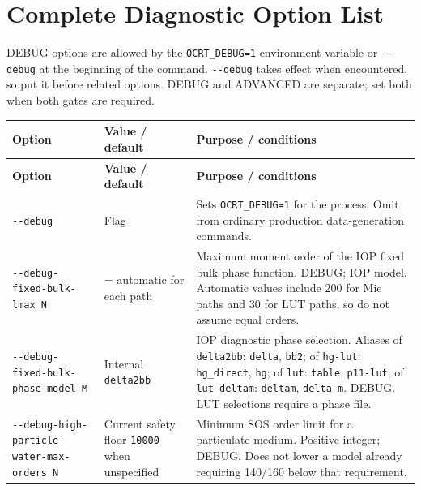 \section{Complete Diagnostic Option List}
\label{sec:auto:03_options:9}
DEBUG options are allowed by the \texttt{OCRT\_\allowbreak{}DEBUG=\allowbreak{}1} environment variable or \texttt{-\allowbreak{}-\allowbreak{}debug} at the beginning of the command. \texttt{-\allowbreak{}-\allowbreak{}debug} takes effect when encountered, so put it before related options. DEBUG and ADVANCED are separate; set both when both gates are required.


{\TableFont
\begin{longtable}{@{}>{\raggedright\arraybackslash}p{}>{\raggedright\arraybackslash}p{}>{\raggedright\arraybackslash}p{}@{}}
\toprule
\textbf{Option} & \textbf{Value / default} & \textbf{Purpose / conditions} \\
\midrule
\endfirsthead
\toprule
\textbf{Option} & \textbf{Value / default} & \textbf{Purpose / conditions} \\
\midrule
\endhead
\bottomrule
\endfoot
\texttt{-\allowbreak{}-\allowbreak{}debug} & Flag & Sets \texttt{OCRT\_\allowbreak{}DEBUG=\allowbreak{}1} for the process. Omit from ordinary production data-generation commands. \\
\texttt{-\allowbreak{}-\allowbreak{}debug-\allowbreak{}fixed-\allowbreak{}bulk-\allowbreak{}lmax N} & 0 = automatic for each path & Maximum moment order of the IOP fixed bulk phase function. DEBUG; IOP model. Automatic values include 200 for Mie paths and 30 for LUT paths, so do not assume equal orders. \\
\texttt{-\allowbreak{}-\allowbreak{}debug-\allowbreak{}fixed-\allowbreak{}bulk-\allowbreak{}phase-\allowbreak{}model M} & Internal \texttt{delta2bb} & IOP diagnostic phase selection. Aliases of \texttt{delta2bb}: \texttt{delta}, \texttt{bb2}; of \texttt{hg-\allowbreak{}lut}: \texttt{hg\_\allowbreak{}direct}, \texttt{hg}; of \texttt{lut}: \texttt{table}, \texttt{p11-\allowbreak{}lut}; of \texttt{lut-\allowbreak{}deltam}: \texttt{deltam}, \texttt{delta-\allowbreak{}m}. DEBUG. LUT selections require a phase file. \\
\texttt{-\allowbreak{}-\allowbreak{}debug-\allowbreak{}high-\allowbreak{}particle-\allowbreak{}water-\allowbreak{}max-\allowbreak{}orders N} & Current safety floor \texttt{10000} when unspecified & Minimum SOS order limit for a particulate medium. Positive integer; DEBUG. Does not lower a model already requiring 140/160 below that requirement. \\

\end{longtable}}
